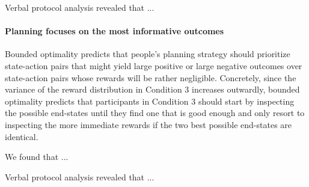 Verbal protocol analysis revealed that ...

\paragraph{Planning focuses on the most informative outcomes}
Bounded optimality predicts that people's planning strategy should prioritize state-action pairs that might yield large positive or large negative outcomes over state-action pairs whose rewards will be rather negligible. Concretely, since the variance of the reward distribution in Condition 3 increases outwardly, bounded optimality predicts that participants in Condition 3 should start by inspecting the possible end-states until they find one that is good enough and only resort to inspecting the more immediate rewards if the two best possible end-states are identical.

We found that ...



Verbal protocol analysis revealed that ...

